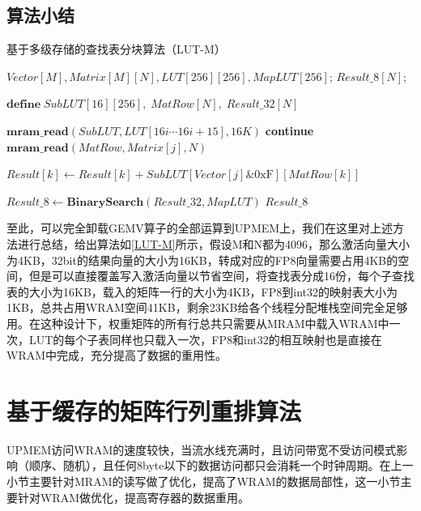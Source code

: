 \subsection{算法小结}

\begin{algorithm}[!htbp]
    \caption{基于多级存储的查找表分块算法（LUT-M）}
    \label{LUT-M}
    \begin{algorithmic}[1]
        \Require $Vector[M], Matrix[M][N], LUT[256][256], MapLUT[256]$; %
        \Ensure $Result\_8[N]$; %

        \State $\textbf{define}\; SubLUT[16][256],\;MatRow[N],\;Result\_32[N]$

            \State $\textbf{mram\_read}(SubLUT, LUT[16i \cdots 16i + 15], 16K)$
            \Comment{\textcolor{blue}{parallel read}}
                    \State \textbf{continue}
                \EndIf
                \State $\textbf{mram\_read}(MatRow, Matrix[j], N)$
                \Comment{\textcolor{blue}{parallel in N for each tasklet}}
                
                \Comment{\textcolor{blue}{parallel in N for each tasklet}}
                    \State $Result[k] \gets Result[k] + SubLUT[Vector[j] \& \text{0xF}][MatRow[k]]$
                \EndFor
            \EndFor
        \EndFor

        \State $Result\_8 \gets \textbf{BinarySearch}(Result\_32, MapLUT)$
        \Comment{\textcolor{blue}{parallel in N}}
        \State \Return $Result\_8$
    \end{algorithmic}
\end{algorithm}

至此，可以完全卸载GEMV算子的全部运算到UPMEM上，我们在这里对上述方法进行总结，给出算法如\ref{LUT-M}所示，假设M和N都为4096，那么激活向量大小为4KB，32bit的结果向量的大小为16KB，转成对应的FP8向量需要占用4KB的空间，但是可以直接覆盖写入激活向量以节省空间，将查找表分成16份，每个子查找表的大小为16KB，载入的矩阵一行的大小为4KB，FP8到int32的映射表大小为1KB，总共占用WRAM空间41KB，剩余23KB给各个线程分配堆栈空间完全足够用。在这种设计下，权重矩阵的所有行总共只需要从MRAM中载入WRAM中一次，LUT的每个子表同样也只载入一次，FP8和int32的相互映射也是直接在WRAM中完成，充分提高了数据的重用性。

\section{基于缓存的矩阵行列重排算法}
UPMEM访问WRAM的速度较快，当流水线充满时，且访问带宽不受访问模式影响（顺序、随机），且任何8byte以下的数据访问都只会消耗一个时钟周期\cite{BenchmarkingMutlu}。在上一小节主要针对MRAM的读写做了优化，提高了WRAM的数据局部性，这一小节主要针对WRAM做优化，提高寄存器的数据重用。

